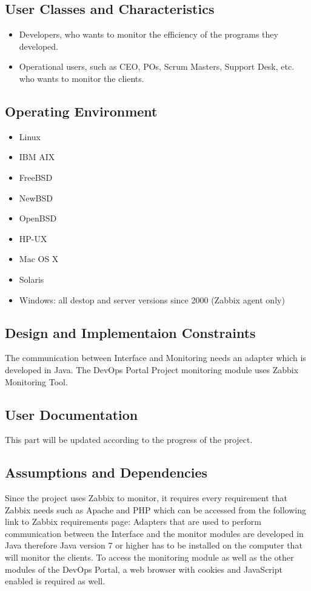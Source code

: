 \documentclass{article}
\newcommand{\MYhref}[3][blue]{\href{#2}{\color{#1}{#3}}}%
\begin{document}
	\subsection{User Classes and Characteristics}
 \begin{itemize}
	\item Developers, who wants to monitor the efficiency of the programs they developed.
	\item Operational users, such as CEO, POs, Scrum Masters, Support Desk, etc. who wants to monitor the clients.
\end{itemize}
	\subsection{Operating Environment}
 \begin{itemize}
 	\item Linux
	\item IBM AIX
	\item FreeBSD
	\item NewBSD
	\item OpenBSD
	\item HP-UX
	\item Mac OS X 
	\item Solaris
	\item Windows: all destop and server versions since 2000 (Zabbix agent only)

\end{itemize}
	\subsection{Design and Implementaion Constraints}
The communication between Interface and Monitoring needs an adapter which is developed in Java. The DevOps Portal Project monitoring module uses Zabbix Monitoring Tool.
	
	\subsection{User Documentation}
This part will be updated according to the progress of the project.

	\subsection{Assumptions and Dependencies}
Since the project uses Zabbix to monitor, it requires every requirement that Zabbix needs such as Apache and PHP which can be accessed from the following link to Zabbix requirements page:
 \MYhref{https://www.zabbix.com/documentation/3.0/manual/installation/requirements}{https://www.zabbix.com/documentation/3.0/manual/installation/requirements}	
Adapters that are used to perform communication between the Interface and the monitor modules are developed in Java therefore Java version 7 or higher has to be installed on the computer that will monitor the clients. 
To access the monitoring module as well as the other modules of the DevOps Portal, a web browser with cookies and JavaScript enabled is required as well.
\end{document}
